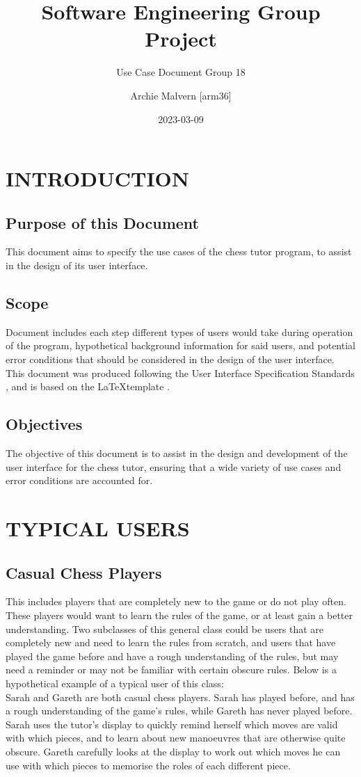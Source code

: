 \documentclass{project}
\begin{document}
\title{Software Engineering Group Project}
\subtitle{Use Case Document Group 18}
\author{Archie Malvern [arm36]}
\date{2023-03-09}
\maketitle
\tableofcontents
\newpage
\section{INTRODUCTION}
\subsection{Purpose of this Document}
This document aims to specify the use cases of the chess tutor program, to assist in the design of its user interface.
\subsection{Scope}
Document includes each step different types of users would take during operation of the program, hypothetical background information for said users, and potential error conditions that should be considered in the design of the user interface.
This document was produced following the User Interface Specification Standards \cite{se.qa.04}, and is based on the \LaTeX template \cite{SE-N66-TEST}.
\subsection{Objectives}
The objective of this document is to assist in the design and development of the user interface for the chess tutor, ensuring that a wide variety of use cases and error conditions are accounted for.
\section{TYPICAL USERS}
\subsection{Casual Chess Players}
This includes players that are completely new to the game or do not play often. These players would want to learn the rules of the game, or at least gain a better understanding. Two subclasses of this general class could be users that are completely new and need to learn the rules from scratch, and users that have played the game before and have a rough understanding of the rules, but may need a reminder or may not be familiar with certain obscure rules. Below is a hypothetical example of a typical user of this class:\\
Sarah and Gareth are both casual chess players. Sarah has played before, and has a rough understanding of the game’s rules, while Gareth has never played before. Sarah uses the tutor’s display to quickly remind herself which moves are valid with which pieces, and to learn about new manoeuvres that are otherwise quite obscure. Gareth carefully looks at the display to work out which moves he can use with which pieces to memorise the roles of each different piece.
\end{document}
